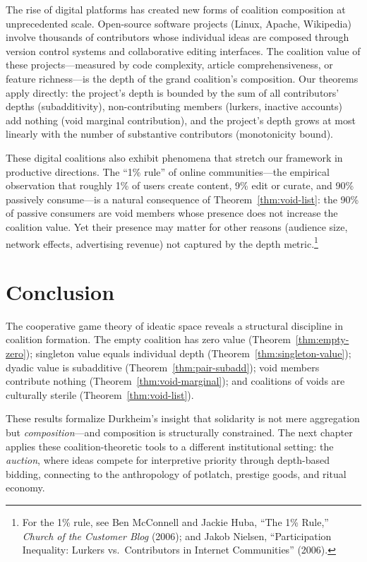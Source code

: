 The rise of digital platforms has created new forms of coalition
composition at unprecedented scale.  Open-source software projects
(Linux, Apache, Wikipedia) involve thousands of contributors whose
individual ideas are composed through version control systems and
collaborative editing interfaces.  The coalition value of these
projects---measured by code complexity, article comprehensiveness, or
feature richness---is the depth of the grand coalition's composition.
Our theorems apply directly: the project's depth is bounded by the sum
of all contributors' depths (subadditivity), non-contributing members
(lurkers, inactive accounts) add nothing (void marginal contribution),
and the project's depth grows at most linearly with the number of
substantive contributors (monotonicity bound).

These digital coalitions also exhibit phenomena that stretch our
framework in productive directions.  The ``1\% rule'' of online
communities---the empirical observation that roughly 1\% of users
create content, 9\% edit or curate, and 90\% passively consume---is a
natural consequence of Theorem~\ref{thm:void-list}: the 90\% of
passive consumers are void members whose presence does not increase the
coalition value.  Yet their presence may matter for other reasons
(audience size, network effects, advertising revenue) not captured by
the depth metric.\footnote{For the 1\% rule, see Ben McConnell and Jackie
Huba, ``The 1\% Rule,'' \textit{Church of the Customer Blog} (2006);
and Jakob Nielsen, ``Participation Inequality: Lurkers vs.\
Contributors in Internet Communities'' (2006).}

\section{Conclusion}
\label{sec:ch13-conclusion}

The cooperative game theory of ideatic space reveals a structural discipline
in coalition formation.  The empty coalition has zero value
(Theorem~\ref{thm:empty-zero}); singleton value equals individual depth
(Theorem~\ref{thm:singleton-value}); dyadic value is subadditive
(Theorem~\ref{thm:pair-subadd}); void members contribute nothing
(Theorem~\ref{thm:void-marginal}); and coalitions of voids are culturally
sterile (Theorem~\ref{thm:void-list}).

These results formalize Durkheim's insight that solidarity is not mere
aggregation but \emph{composition}---and composition is structurally
constrained.  The next chapter applies these coalition-theoretic tools to a
different institutional setting: the \emph{auction}, where ideas compete for
interpretive priority through depth-based bidding, connecting to the
anthropology of potlatch, prestige goods, and ritual economy.
